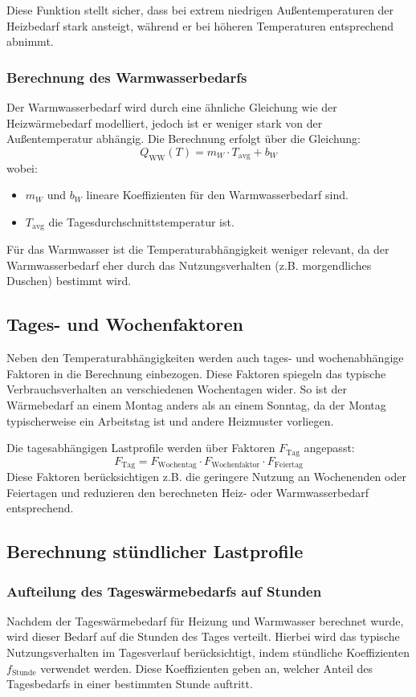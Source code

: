Diese Funktion stellt sicher, dass bei extrem niedrigen Außentemperaturen der Heizbedarf stark ansteigt, während er bei höheren Temperaturen entsprechend abnimmt.

\subsubsection{Berechnung des Warmwasserbedarfs}
Der Warmwasserbedarf wird durch eine ähnliche Gleichung wie der Heizwärmebedarf modelliert, jedoch ist er weniger stark von der Außentemperatur abhängig. Die Berechnung erfolgt über die Gleichung:
\[
Q_{\text{WW}}(T) = m_W \cdot T_{\text{avg}} + b_W
\]
wobei:
\begin{itemize}
    \item \( m_W \) und \( b_W \) lineare Koeffizienten für den Warmwasserbedarf sind.
    \item \( T_{\text{avg}} \) die Tagesdurchschnittstemperatur ist.
\end{itemize}
Für das Warmwasser ist die Temperaturabhängigkeit weniger relevant, da der Warmwasserbedarf eher durch das Nutzungsverhalten (z.B. morgendliches Duschen) bestimmt wird.

\subsection{Tages- und Wochenfaktoren}
Neben den Temperaturabhängigkeiten werden auch tages- und wochenabhängige Faktoren in die Berechnung einbezogen. Diese Faktoren spiegeln das typische Verbrauchsverhalten an verschiedenen Wochentagen wider. So ist der Wärmebedarf an einem Montag anders als an einem Sonntag, da der Montag typischerweise ein Arbeitstag ist und andere Heizmuster vorliegen.

Die tagesabhängigen Lastprofile werden über Faktoren \( F_{\text{Tag}} \) angepasst:
\[
F_{\text{Tag}} = F_{\text{Wochentag}} \cdot F_{\text{Wochenfaktor}} \cdot F_{\text{Feiertag}}
\]
Diese Faktoren berücksichtigen z.B. die geringere Nutzung an Wochenenden oder Feiertagen und reduzieren den berechneten Heiz- oder Warmwasserbedarf entsprechend.

\subsection{Berechnung stündlicher Lastprofile}

\subsubsection{Aufteilung des Tageswärmebedarfs auf Stunden}
Nachdem der Tageswärmebedarf für Heizung und Warmwasser berechnet wurde, wird dieser Bedarf auf die Stunden des Tages verteilt. Hierbei wird das typische Nutzungsverhalten im Tagesverlauf berücksichtigt, indem stündliche Koeffizienten \( f_{\text{Stunde}} \) verwendet werden. Diese Koeffizienten geben an, welcher Anteil des Tagesbedarfs in einer bestimmten Stunde auftritt.

